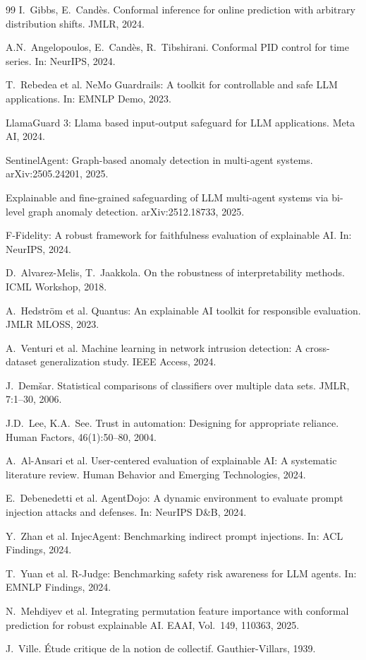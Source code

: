 \documentclass[preprint,review,12pt]{elsarticle}
\begin{document}
\begin{thebibliography}{99}
 I.~Gibbs, E.~Cand\`{e}s. Conformal inference for online prediction with arbitrary distribution shifts. JMLR, 2024.

 A.N.~Angelopoulos, E.~Cand\`{e}s, R.~Tibshirani. Conformal PID control for time series. In: NeurIPS, 2024.

 T.~Rebedea et al. NeMo Guardrails: A toolkit for controllable and safe LLM applications. In: EMNLP Demo, 2023.

 LlamaGuard 3: Llama based input-output safeguard for LLM applications. Meta AI, 2024.

 SentinelAgent: Graph-based anomaly detection in multi-agent systems. arXiv:2505.24201, 2025.

 Explainable and fine-grained safeguarding of LLM multi-agent systems via bi-level graph anomaly detection. arXiv:2512.18733, 2025.

 F-Fidelity: A robust framework for faithfulness evaluation of explainable AI. In: NeurIPS, 2024.

 D.~Alvarez-Melis, T.~Jaakkola. On the robustness of interpretability methods. ICML Workshop, 2018.

 A.~Hedstr\"{o}m et al. Quantus: An explainable AI toolkit for responsible evaluation. JMLR MLOSS, 2023.

 A.~Venturi et al. Machine learning in network intrusion detection: A cross-dataset generalization study. IEEE Access, 2024.

 J.~Dem\v{s}ar. Statistical comparisons of classifiers over multiple data sets. JMLR, 7:1--30, 2006.

 J.D.~Lee, K.A.~See. Trust in automation: Designing for appropriate reliance. Human Factors, 46(1):50--80, 2004.

 A.~Al-Ansari et al. User-centered evaluation of explainable AI: A systematic literature review. Human Behavior and Emerging Technologies, 2024.

 E.~Debenedetti et al. AgentDojo: A dynamic environment to evaluate prompt injection attacks and defenses. In: NeurIPS D\&B, 2024.

 Y.~Zhan et al. InjecAgent: Benchmarking indirect prompt injections. In: ACL Findings, 2024.

 T.~Yuan et al. R-Judge: Benchmarking safety risk awareness for LLM agents. In: EMNLP Findings, 2024.

 N.~Mehdiyev et al. Integrating permutation feature importance with conformal prediction for robust explainable AI. EAAI, Vol.~149, 110363, 2025.

 J.~Ville. \'{E}tude critique de la notion de collectif. Gauthier-Villars, 1939.

\end{thebibliography}
\end{document}
